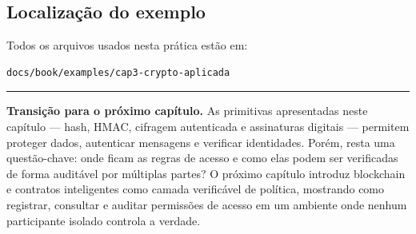 \subsection{Localização do exemplo}
Todos os arquivos usados nesta prática estão em:
\begin{verbatim}
docs/book/examples/cap3-crypto-aplicada
\end{verbatim}

\vspace{1em}
\noindent\rule{\textwidth}{0.4pt}
\vspace{0.5em}
\noindent\textbf{Transição para o próximo capítulo.}
As primitivas apresentadas neste capítulo --- hash, HMAC, cifragem autenticada e assinaturas digitais --- permitem proteger dados, autenticar mensagens e verificar identidades. Porém, resta uma questão-chave: onde ficam as regras de acesso e como elas podem ser verificadas de forma auditável por múltiplas partes? O próximo capítulo introduz blockchain e contratos inteligentes como camada verificável de política, mostrando como registrar, consultar e auditar permissões de acesso em um ambiente onde nenhum participante isolado controla a verdade.

